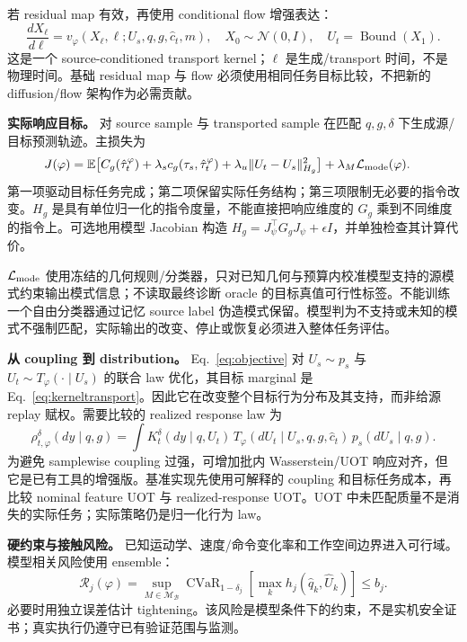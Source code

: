 \documentclass[11pt]{article}
\newcommand{\E}{\mathbb E}
\begin{document}
若 residual map 有效，再使用 conditional flow 增强表达：
\begin{equation}
 \frac{dX_\ell}{d\ell}=v_\varphi(X_\ell,\ell;U_s,q,g,\hat c_t,m),
 \quad X_0\sim\mathcal N(0,I),\quad U_t=\operatorname{Bound}(X_1).
 \label{eq:flow}
\end{equation}
这是一个 source-conditioned transport kernel；$\ell$ 是生成/transport 时间，不是物理时间。基础 residual map 与 flow 必须使用相同任务目标比较，不把新的 diffusion/flow 架构作为必需贡献。

\textbf{实际响应目标。} 对 source sample 与 transported sample 在匹配 $q,g,\delta$ 下生成源/目标预测轨迹。主损失为
\begin{equation}
 \begin{aligned}
 J(\varphi)=\E\big[&C_g(\hat\tau_t^\varphi)
 +\lambda_s c_g(\tau_s,\hat\tau_t^\varphi)
 +\lambda_u\|U_t-U_s\|^2_{H_g}\big]
 +\lambda_M\mathcal L_{\rm mode}(\varphi).
 \end{aligned}
 \label{eq:objective}
\end{equation}
第一项驱动目标任务完成；第二项保留实际任务结构；第三项限制无必要的指令改变。$H_g$ 是具有单位归一化的指令度量，不能直接把响应维度的 $G_g$ 乘到不同维度的指令上。可选地用模型 Jacobian 构造 $H_g=J_\psi^\top G_gJ_\psi+\epsilon I$，并单独检查其计算代价。

$\mathcal L_{\rm mode}$ 使用冻结的几何规则/分类器，只对已知几何与预算内校准模型支持的源模式约束输出模式信息；不读取最终诊断 oracle 的目标真值可行性标签。不能训练一个自由分类器通过记忆 source label 伪造模式保留。模型判为不支持或未知的模式不强制匹配，实际输出的改变、停止或恢复必须进入整体任务评估。

\textbf{从 coupling 到 distribution。} Eq.~\eqref{eq:objective} 对 $U_s\sim p_s$ 与 $U_t\sim T_\varphi(\cdot\mid U_s)$ 的联合 law 优化，其目标 marginal 是 Eq.~\eqref{eq:kerneltransport}。因此它在改变整个目标行为分布及其支持，而非给源 replay 赋权。需要比较的 realized response law 为
\begin{equation}
 \rho_{t,\varphi}^{\delta}(dy\mid q,g)
 =\int K_t^\delta(dy\mid q,U_t)\,
 T_\varphi(dU_t\mid U_s,q,g,\hat c_t)\,p_s(dU_s\mid q,g).
 \label{eq:responselaw}
\end{equation}
为避免 samplewise coupling 过强，可增加批内 Wasserstein/UOT 响应对齐，但它是已有工具的增强版。基准实现先使用可解释的 coupling 和目标任务成本，再比较 nominal feature UOT 与 realized-response UOT。UOT 中未匹配质量不是消失的实际任务；实际策略仍是归一化行为 law。

\textbf{硬约束与接触风险。} 已知运动学、速度/命令变化率和工作空间边界进入可行域。模型相关风险使用 ensemble：
\begin{equation}
 \mathcal R_j(\varphi)=
 \sup_{M\in\mathcal M_{\mathcal B}}
 \operatorname{CVaR}_{1-\delta_j}
 \left[\max_k h_j(\hat q_k,\hat U_k)\right]\le b_j.
 \label{eq:risk}
\end{equation}
必要时用独立误差估计 tightening。该风险是模型条件下的约束，不是实机安全证书；真实执行仍遵守已有验证范围与监测。
\end{document}
